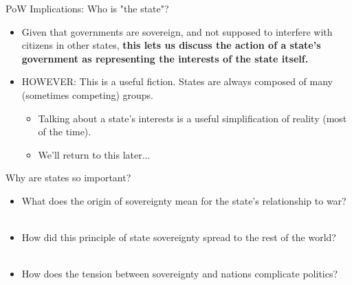 \documentclass[handout]{beamer}
\begin{document}
\begin{frame}{\LARGE PoW Implications: Who is "the state"?}
	\begin{itemize}
		\item Given that governments are sovereign, and not supposed to interfere with citizens in other states, \textbf{this lets us discuss the action of a state’s government as representing the interests of the state itself.} \pause
		\item HOWEVER: This is a useful fiction. States are always composed of many (sometimes competing) groups.
		\begin{itemize}
			\item Talking about a state's interests is a useful simplification of reality (most of the time).
			\item We'll return to this later...
		\end{itemize}
	\end{itemize}
\end{frame}


\begin{frame}{\LARGE Why are states so important?}
\begin{itemize}
     \item What does the origin of sovereignty mean for the state's relationship to war? 
    \\~\\
    \item How did this principle of state sovereignty spread to the rest of the world?
    \\~\\
    \item How does the tension between sovereignty and nations complicate politics?
\end{itemize}
\end{frame}
\end{document}
